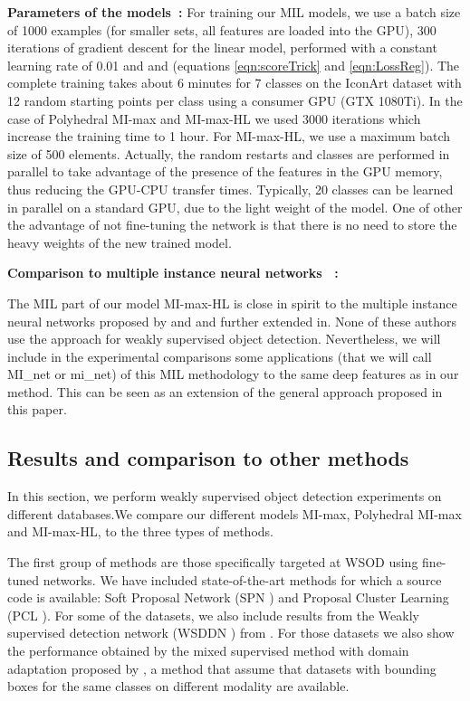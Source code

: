 \documentclass[preprint]{elsarticle}
\newcommand\MILS{MI-max}
\newcommand\mimaxaddlayerS{MI-max-HL}
\newcommand\MaxOfMaxS{Polyhedral MI-max}
\begin{document}
{\bf Parameters of the models~:} For training our MIL models, we use a batch size of 1000 examples (for smaller sets, all features are loaded into the GPU), 300 iterations of gradient descent for the linear model, performed with a constant learning rate of 0.01 and   and   (equations \eqref{eqn:scoreTrick} and \eqref{eqn:LossReg}). The complete training takes about 6 minutes for 7 classes on the IconArt dataset \cite{gonthier_weakly_2018} with 12 random starting points per class using a consumer GPU (GTX 1080Ti).  In the case of  \MaxOfMaxS{} and \mimaxaddlayerS{} we used 3000 iterations which increase the training time to 1 hour. For \mimaxaddlayerS{}, we use a maximum batch size of 500 elements.
Actually, the random restarts and classes are performed in parallel to take advantage of the presence of the features in the GPU memory, thus reducing the GPU-CPU transfer times. Typically, 20 classes can be learned in parallel on a standard GPU, due to the light weight of the model. One of other the advantage of not fine-tuning the network is that there is no need to store the heavy weights of the new trained model.


{\bf Comparison to multiple instance neural networks ~:}

The MIL part of our model \mimaxaddlayerS{} is close in spirit to the multiple instance neural networks proposed by \cite{ramon_multi_2000} and \cite{zhou_neural_2002} and further extended in\cite{wang_revisiting_2018}. None of these authors use the approach for weakly supervised object detection. 
Nevertheless, we will include in the experimental comparisons some applications (that we will call MI\_net or mi\_net) of this MIL methodology to the same deep features as in our method. This can be seen as an extension of the general approach proposed in this paper.  



\subsection{Results and comparison to other methods}
\label{sec:ExpResults}

In this section, we perform weakly supervised object detection experiments on different databases.We compare our different models \MILS{}, \MaxOfMaxS{} and \mimaxaddlayerS{}, to the three types of methods. 

The first group of methods are those specifically targeted at WSOD using fine-tuned networks. We have included state-of-the-art methods for which a source code is available: Soft Proposal Network (SPN \cite{zhu_soft_2017}) and Proposal Cluster Learning (PCL \cite{tang_pcl_2018}). For some of the datasets, we also include results from the Weakly supervised detection network (WSDDN \cite{bilen_weakly_2016}) from \cite{inoue_crossdomain_2018}.  For those datasets we also show the performance obtained by the mixed supervised method with domain adaptation proposed by \cite{inoue_crossdomain_2018}, a method that assume that datasets with bounding boxes for the same classes on different modality are available. 
\end{document}

